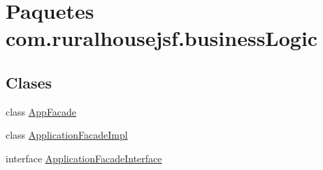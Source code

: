 \hypertarget{namespacecom_1_1ruralhousejsf_1_1business_logic}{}\section{Paquetes com.\+ruralhousejsf.\+business\+Logic}
\label{namespacecom_1_1ruralhousejsf_1_1business_logic}
\subsection*{Clases}
\begin{DoxyCompactItemize}
\item 
class \mbox{\hyperlink{classcom_1_1ruralhousejsf_1_1business_logic_1_1_app_facade}{App\+Facade}}
\item 
class \mbox{\hyperlink{classcom_1_1ruralhousejsf_1_1business_logic_1_1_application_facade_impl}{Application\+Facade\+Impl}}
\item 
interface \mbox{\hyperlink{interfacecom_1_1ruralhousejsf_1_1business_logic_1_1_application_facade_interface}{Application\+Facade\+Interface}}
\end{DoxyCompactItemize}
